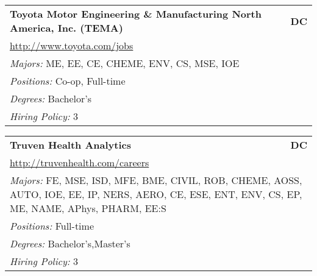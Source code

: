 \documentclass[twoside]{article}
\begin{document}
\begin{center}
\begin{multicols}{3}
\begin{FlushLeft}
\begin{minipage}{\columnwidth}
\end{minipage}
 
\begin{minipage}{\columnwidth}\begin{tabularx}{.95\columnwidth}{Xr}
                 {\Large\bf Toyota Motor Engineering \& Manufacturing North America, Inc. (TEMA)} & {\Large\bf DC}\\
    \multicolumn{2}{p{.95\columnwidth}}{\url{http://www.toyota.com/jobs}}\\
    \multicolumn{2}{p{.95\columnwidth}}{\emph{Majors:} ME, EE, CE, CHEME, ENV, CS, MSE, IOE}\\
    \multicolumn{2}{p{.95\columnwidth}}{\emph{Positions:} Co-op, Full-time}\\
    \multicolumn{2}{p{.95\columnwidth}}{\emph{Degrees:} Bachelor's}\\
    \multicolumn{2}{p{.95\columnwidth}}{\emph{Hiring Policy:} 3}\\
    \end{tabularx}
    
\end{minipage}
 
\begin{minipage}{\columnwidth}\begin{tabularx}{.95\columnwidth}{Xr}
                 {\Large\bf Truven Health Analytics} & {\Large\bf DC}\\
    \multicolumn{2}{p{.95\columnwidth}}{\url{http://truvenhealth.com/careers}}\\
    \multicolumn{2}{p{.95\columnwidth}}{\emph{Majors:} FE, MSE, ISD, MFE, BME, CIVIL, ROB, CHEME, AOSS, AUTO, IOE, EE, IP, NERS, AERO, CE, ESE, ENT, ENV, CS, EP, ME, NAME, APhys, PHARM, EE:S}\\
    \multicolumn{2}{p{.95\columnwidth}}{\emph{Positions:} Full-time}\\
    \multicolumn{2}{p{.95\columnwidth}}{\emph{Degrees:} Bachelor's,Master's}\\
    \multicolumn{2}{p{.95\columnwidth}}{\emph{Hiring Policy:} 3}\\
    \end{tabularx}
    
\end{minipage}
 

\end{FlushLeft}
\end{multicols}
\end{center}
\end{document}
